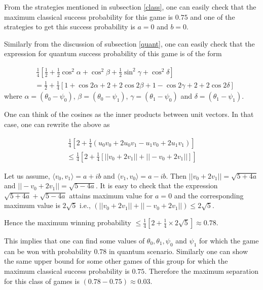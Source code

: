 \documentclass[]{svjour3}
\begin{document}

From the strategies mentioned in subsection \ref{class}, one can easily check that the maximum classical success probability for this game is $0.75$ and one of the strategies to get this success probability is $a=0$ and $b=0$.

Similarly from the discussion of subsection \ref{quant}, one can easily check that the expression for quantum success probability of this game is of the form

\begin{align*}
&~ \frac{1}{4}\left[\frac{1}{2} + \frac{1}{2}\cos^2{\alpha} + \cos^2 {\beta} + \frac{1}{2}\sin^2 {\gamma} + \cos^2 {\delta}\right]\ \\
&= \frac{1}{2} + \frac{1}{4} [1+\cos{2\alpha}+2+2\cos{2\beta}+1-\cos{2\gamma}+2+2\cos{2\delta}]
\end{align*}
where $\alpha=(\theta_0 - \psi_0)$, $\beta=(\theta_0 - \psi_1)$, $\gamma=(\theta_1 - \psi_0)$ and 
$\delta=(\theta_1 - \psi_1)$. 

One can think of the cosines as the inner products between unit vectors. In that case, one can rewrite the above as

\begin{align*}
\frac{1}{4}[2 + \frac{1}{4}(u_{0}v_{0} + 2u_{0}v_{1} - u_{1}v_{0} + 2u_{1}v_{1})] 
\end{align*}
\begin{align*}
\le \frac{1}{4} \left[2 + \frac{1}{4}[ ||v_{0} + 2v_{1}|| +  ||-v_{0} + 2v_{1}||] \right]
\end{align*}

Let us assume, $\langle v_0, v_1 \rangle = a + ib$ and $\langle v_1, v_0 \rangle = a - ib$. Then $||v_0 + 2v_1|| = \sqrt{5 + 4a}$ and $||-v_0 + 2v_1|| = \sqrt{5 - 4a}$. It is easy to check that the expression $\sqrt{5 + 4a} + \sqrt{5 - 4a}$ attains maximum value for $a = 0$ and the corresponding maximum value is $2\sqrt{5}$ i.e., $ ( ||v_0 + 2v_1|| + ||-v_0 + 2v_1||) \leq 2\sqrt{5}$.


Hence the maximum winning probability 
$\le \frac{1}{4} \left[2 + \frac{1}{4} \times 2\sqrt{5} \right] \approx 0.78$.

This implies that one can find some values of $\theta_0, \theta_1, \psi_0$ and $\psi_1$ for which the game can be won with probability $0.78$ in quantum scenario. Similarly one can show the same upper bound for some other games of this group for which the maximum classical success probability is $0.75$.
Therefore the maximum separation for this class of games is $(0.78 - 0.75) \approx 0.03$.
\end{document}
